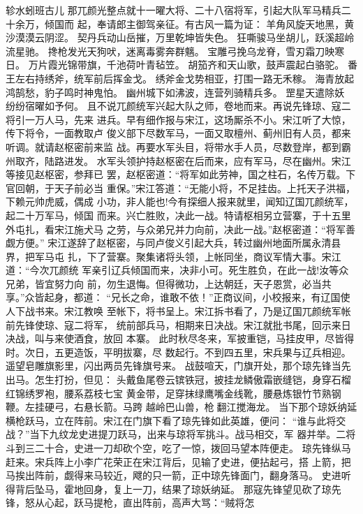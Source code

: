 轸水蚓班古儿
那兀颜光整点就十一曜大将、二十八宿将军，引起大队军马精兵二十余万，倾国而
起，奉请郎主御驾亲征。有古风一篇为证：
羊角风旋天地黑，黄沙漠漠云阴涩。
契丹兵动山岳摧，万里乾坤皆失色。
狂嘶骏马坐胡儿，跃溪超岭流星驰。
搀枪发光天狗吠，迷离毒雾奔群魑。
宝雕弓挽乌龙脊，雪刃霜刀映寒日。
万片霞光锦带旗，千池荷叶青毡笠。
胡笳齐和天山歌，鼓声震起白骆驼。
番王左右持绣斧，统军前后挥金戈。
绣斧金戈势相亚，打围一路无禾稼。
海青放起鸿鹄愁，豹子鸣时神鬼怕。
幽州城下如沸波，连营列骑精兵多。
罡星天遣除妖，纷纷宿曜如予何。
且不说兀颜统军兴起大队之师，卷地而来。再说先锋琼、寇二将引一万人马，先来
进兵。早有细作报与宋江，这场厮杀不小。宋江听了大惊，传下将令，一面教取卢
俊义部下尽数军马，一面又取檀州、蓟州旧有人员，都来听调。就请赵枢密前来监
战。再要水军头目，将带水手人员，尽数登岸，都到霸州取齐，陆路进发。
水军头领护持赵枢密在后而来，应有军马，尽在幽州。宋江等接见赵枢密，参拜已
罢，赵枢密道：“将军如此劳神，国之柱石，名传万载。下官回朝，于天子前必当
重保。”宋江答道：“无能小将，不足挂齿。上托天子洪福，下赖元帅虎威，偶成
小功，非人能也!今有探细人报来就里，闻知辽国兀颜统军，起二十万军马，倾国
而来。兴亡胜败，决此一战。特请枢相另立营寨，于十五里外屯扎，看宋江施犬马
之劳，与众弟兄并力向前，决此一战。”赵枢密道：“将军善觑方便。”
宋江遂辞了赵枢密，与同卢俊义引起大兵，转过幽州地面所属永清县界，把军马屯
扎，下了营寨。聚集诸将头领，上帐同坐，商议军情大事。宋江道：“今次兀颜统
军亲引辽兵倾国而来，决非小可。死生胜负，在此一战!汝等众兄弟，皆宜努力向
前，勿生退悔。但得微功，上达朝廷，天子恩赏，必当共享。”众皆起身，都道：
“兄长之命，谁敢不依！”正商议间，小校报来，有辽国使人下战书来。宋江教唤
至帐下，将书呈上。宋江拆书看了，乃是辽国兀颜统军帐前先锋使琼、寇二将军，
统前部兵马，相期来日决战。宋江就批书尾，回示来日决战，叫与来使酒食，放回
本寨。
此时秋尽冬来，军披重铠，马挂皮甲，尽皆得时。次日，五更造饭，平明拔寨，尽
数起行。不到四五里，宋兵果与辽兵相迎。遥望皂雕旗影里，闪出两员先锋旗号来。
战鼓喧天，门旗开处，那个琼先锋当先出马。怎生打扮，但见：
头戴鱼尾卷云镔铁冠，披挂龙鳞傲霜嵌缝铠，身穿石榴红锦绣罗袍，腰系荔枝七宝
黄金带，足穿抹绿鹰嘴金线靴，腰悬炼银竹节熟钢鞭。左挂硬弓，右悬长箭。马跨
越岭巴山兽，枪翻江搅海龙。
当下那个琼妖纳延横枪跃马，立在阵前。宋江在门旗下看了琼先锋如此英雄，便问：
“谁与此将交战？”当下九纹龙史进提刀跃马，出来与琼将军挑斗。战马相交，军
器并举。二将斗到三二十合，史进一刀却砍个空，吃了一惊，拨回马望本阵便走。
琼先锋纵马赶来。宋兵阵上小李广花荣正在宋江背后，见输了史进，便拈起弓，搭
上箭，把马挨出阵前，觑得来马较近，飕的只一箭，正中琼先锋面门，翻身落马。
史进听得背后坠马，霍地回身，复上一刀，结果了琼妖纳延。
那寇先锋望见砍了琼先锋，怒从心起，跃马提枪，直出阵前，高声大骂：“贼将怎
